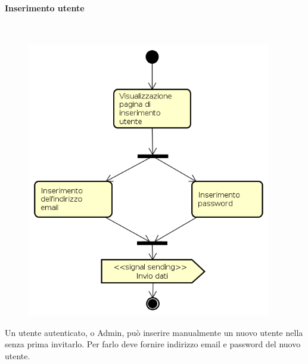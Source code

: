 \paragraph{Inserimento utente} \mbox{} \\
\begin{figure}[H]
\begin{center}
\includegraphics[height=12cm]{res/sections/backend/activities/inserimentoUtente.png}
\end{center}
\end{figure}
Un utente autenticato,  o Admin, può inserire manualmente un nuovo utente nella  senza prima invitarlo. Per farlo deve fornire indirizzo email e password del nuovo utente.
